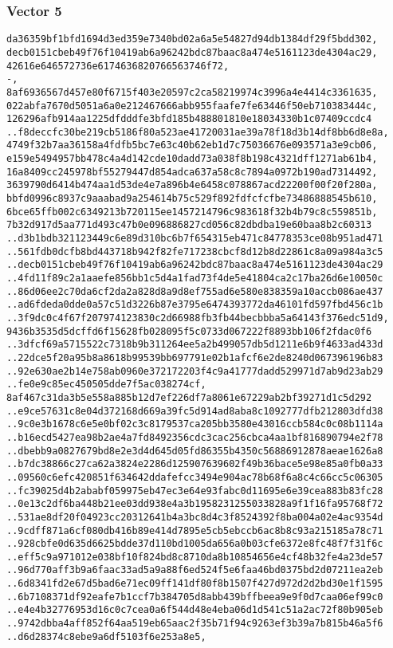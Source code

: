 \documentclass[
]{article}
\begin{document}
\hypertarget{vector-5-2}{%
\subsubsection{Vector 5}\label{vector-5-2}}

\begin{verbatim}
da36359bf1bfd1694d3ed359e7340bd02a6a5e54827d94db1384df29f5bdd302,
decb0151cbeb49f76f10419ab6a96242bdc87baac8a474e5161123de4304ac29,
42616e646572736e6174636820766563746f72,
-,
8af6936567d457e80f6715f403e20597c2ca58219974c3996a4e4414c3361635,
022abfa7670d5051a6a0e212467666abb955faafe7fe63446f50eb710383444c,
126296afb914aa1225dfdddfe3bfd185b488801810e18034330b1c07409ccdc4
..f8deccfc30be219cb5186f80a523ae41720031ae39a78f18d3b14df8bb6d8e8a,
4749f32b7aa36158a4fdfb5bc7e63c40b62eb1d7c75036676e093571a3e9cb06,
e159e5494957bb478c4a4d142cde10dadd73a038f8b198c4321dff1271ab61b4,
16a8409cc245978bf55279447d854adca637a58c8c7894a0972b190ad7314492,
3639790d6414b474aa1d53de4e7a896b4e6458c078867acd22200f00f20f280a,
bbfd0996c8937c9aaabad9a254614b75c529f892fdfcfcfbe73486888545b610,
6bce65ffb002c6349213b720115ee1457214796c983618f32b4b79c8c559851b,
7b32d917d5aa771d493c47b0e096886827cd056c82dbdba19e60baa8b2c60313
..d3b1bdb321123449c6e89d310bc6b7f654315eb471c84778353ce08b951ad471
..561fdb0dcfb8bd443718b942f82fe717238cbcf8d12b8d22861c8a09a984a3c5
..decb0151cbeb49f76f10419ab6a96242bdc87baac8a474e5161123de4304ac29
..4fd11f89c2a1aaefe856bb1c5d4a1fad73f4de5e41804ca2c17ba26d6e10050c
..86d06ee2c70da6cf2da2a828d8a9d8ef755ad6e580e838359a10accb086ae437
..ad6fdeda0dde0a57c51d3226b87e3795e6474393772da46101fd597fbd456c1b
..3f9dc0c4f67f207974123830c2d66988fb3fb44becbbba5a64143f376edc51d9,
9436b3535d5dcffd6f15628fb028095f5c0733d067222f8893bb106f2fdac0f6
..3dfcf69a5715522c7318b9b311264ee5a2b499057db5d1211e6b9f4633ad433d
..22dce5f20a95b8a8618b99539bb697791e02b1afcf6e2de8240d067396196b83
..92e630ae2b14e758ab0960e372172203f4c9a41777dadd529971d7ab9d23ab29
..fe0e9c85ec450505dde7f5ac038274cf,
8af467c31da3b5e558a885b12d7ef226df7a8061e67229ab2bf39271d1c5d292
..e9ce57631c8e04d372168d669a39fc5d914ad8aba8c1092777dfb212803dfd38
..9c0e3b1678c6e5e0bf02c3c8179537ca205bb3580e43016ccb584c0c08b1114a
..b16ecd5427ea98b2ae4a7fd8492356cdc3cac256cbca4aa1bf816890794e2f78
..dbebb9a0827679bd8e2e3d4d645d05fd86355b4350c56886912878aeae1626a8
..b7dc38866c27ca62a3824e2286d125907639602f49b36bace5e98e85a0fb0a33
..09560c6efc420851f634642ddafefcc3494e904ac78b68f6a8c4c66cc5c06305
..fc39025d4b2ababf059975eb47ec3e64e93fabc0d11695e6e39cea883b83fc28
..0e13c2df6ba448b21ee03dd938e4a3b1958231255033828a9f1f16fa95768f72
..531ae8df20f04923cc20312641b4a3bc8d4c3f8524392f8ba004a02e4ac9354d
..9cdff871a6cf080db416b89e414d7895e5cb5ebccb6ac8b8c93a215185a78c71
..928cbfe0d635d6625bdde37d110bd1005da656a0b03cfe6372e8fc48f7f31f6c
..eff5c9a971012e038bf10f824bd8c8710da8b10854656e4cf48b32fe4a23de57
..96d770aff3b9a6faac33ad5a9a88f6ed524f5e6faa46bd0375bd2d07211ea2eb
..6d8341fd2e67d5bad6e71ec09ff141df80f8b1507f427d972d2d2bd30e1f1595
..6b7108371df92eafe7b1ccf7b384705d8abb439bffbeea9e9f0d7caa06ef99c0
..e4e4b32776953d16c0c7cea0a6f544d48e4eba06d1d541c51a2ac72f80b905eb
..9742dbba4aff852f64aa519eb65aac2f35b71f94c9263ef3b39a7b815b46a5f6
..d6d28374c8ebe9a6df5103f6e253a8e5,
\end{verbatim}
\end{document}
